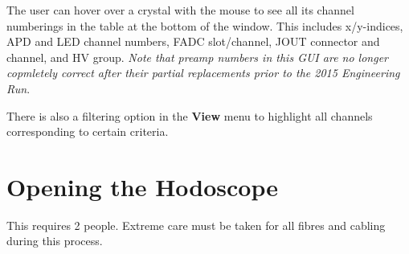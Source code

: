 \documentclass[12pt]{article}
\begin{document}
The user can hover over a crystal with the mouse to see all its channel numberings in the table at the bottom of the window.  This includes x/y-indices, APD and LED channel numbers, FADC slot/channel, JOUT connector and channel, and HV group.  {\em Note that preamp numbers in this GUI are no longer copmletely correct after their partial replacements prior to the 2015 Engineering Run}.  

There is also a filtering option in the {\bf View} menu to highlight all channels corresponding to certain criteria.



\section{Opening the Hodoscope}

This requires 2 people.  Extreme care must be taken for all fibres and cabling during this process.  

%
%
\end{document}
